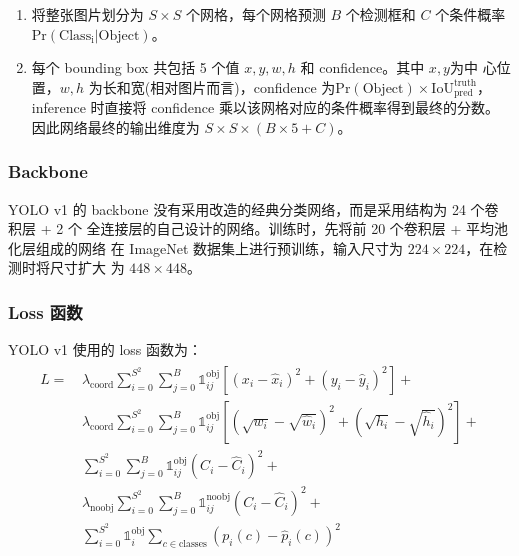 \begin{enumerate}
  \item 将整张图片划分为 $S \times S$ 个网格，每个网格预测 $ B $ 个检测框和 $ C $
  个条件概率 $ \mathrm{Pr}(\mathrm{Class_i}|\mathrm{Object}) $。
  \item 每个 bounding box 共包括 5 个值 $x, y, w, h$ 和 confidence。其中 $x, y$为中
  心位置，$w, h$ 为长和宽(相对图片而言)，confidence 为$\mathrm{Pr}(\mathrm{Object}) \times
  \mathrm{IoU}^{\mathrm{truth}}_{\mathrm{pred}}$，inference 时直接将 confidence
  乘以该网格对应的条件概率得到最终的分数。因此网络最终的输出维度为 $ S \times S
  \times (B \times 5 + C) $。
\end{enumerate}


\subsubsection{Backbone}
YOLO v1 的 backbone 没有采用改造的经典分类网络，而是采用结构为 24 个卷积层 + 2 个
全连接层的自己设计的网络。训练时，先将前 20 个卷积层 + 平均池化层组成的网络
在 ImageNet 数据集上进行预训练，输入尺寸为 $224 \times 224$，在检测时将尺寸扩大
为 $448 \times 448$。

\subsubsection{Loss 函数}

YOLO v1 使用的 loss 函数为：
\begin{align}
  \label{equ:yolo-v1-loss}
  \begin{split}
    L = & \, \lambda_{\mathrm{coord}} \sum_{i=0}^{S^2} \sum_{j=0}^{B} \mathds{1}_{ij}^{\mathrm{obj}} \left [ \left (x_i - \hat{x}_i \right )^2 + \left (y_i - \hat{y}_i \right )^2 \right ] + \\
    & \, \lambda_{\mathrm{coord}} \sum_{i=0}^{S^2} \sum_{j=0}^{B} \mathds{1}_{ij}^{\mathrm{obj}} \left [ \left(\sqrt{w_i} - \sqrt{\hat{w}_i} \right)^2 + \left (\sqrt{h_i} - \sqrt{\hat{h}_i} \right )^2 \right ] + \\
    & \, \sum_{i=0}^{S^2} \sum_{j=0}^{B} \mathds{1}_{ij}^{\mathrm{obj}} \left( C_i - \hat{C}_i \right)^2 + \\
    & \, \lambda_{\mathrm{noobj}} \sum_{i=0}^{S^2} \sum_{j=0}^{B} \mathds{1}_{ij}^{\mathrm{noobj}} \left( C_i - \hat{C}_i \right)^2 + \\
    & \, \sum_{i=0}^{S^2} \mathds{1}_{i}^{\mathrm{obj}} \sum_{c \in \mathrm{classes}} \left( p_i(c) - \hat{p}_i(c) \right)^2
  \end{split}
\end{align}

